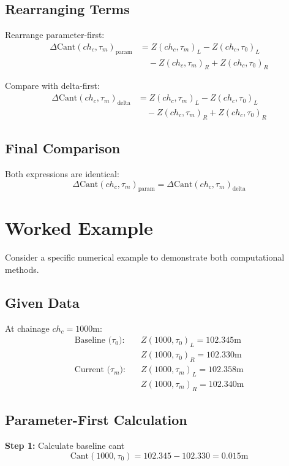 \documentclass{article}
\begin{document}
\subsection{Rearranging Terms}
Rearrange parameter-first:
\begin{align}
\Delta\text{Cant}(ch_c, \tau_m)_{\text{param}} &= Z(ch_c, \tau_m)_L - Z(ch_c, \tau_0)_L \nonumber \\
&\quad - Z(ch_c, \tau_m)_R + Z(ch_c, \tau_0)_R
\end{align}

Compare with delta-first:
\begin{align}
\Delta\text{Cant}(ch_c, \tau_m)_{\text{delta}} &= Z(ch_c, \tau_m)_L - Z(ch_c, \tau_0)_L \nonumber \\
&\quad - Z(ch_c, \tau_m)_R + Z(ch_c, \tau_0)_R
\end{align}

\subsection{Final Comparison}
Both expressions are identical:
\begin{equation}
\Delta\text{Cant}(ch_c, \tau_m)_{\text{param}} = \Delta\text{Cant}(ch_c, \tau_m)_{\text{delta}}
\end{equation}

\section{Worked Example}
Consider a specific numerical example to demonstrate both computational methods.

\subsection{Given Data}
At chainage $ch_c = 1000$m:
\begin{align}
\text{Baseline (}\tau_0\text{):} \quad &Z(1000, \tau_0)_L = 102.345\text{m} \nonumber \\
&Z(1000, \tau_0)_R = 102.330\text{m} \\[0.5em]
\text{Current (}\tau_m\text{):} \quad &Z(1000, \tau_m)_L = 102.358\text{m} \nonumber \\
&Z(1000, \tau_m)_R = 102.340\text{m}
\end{align}

\subsection{Parameter-First Calculation}
\textbf{Step 1:} Calculate baseline cant
\begin{equation}
\text{Cant}(1000, \tau_0) = 102.345 - 102.330 = 0.015\text{m}
\end{equation}
\end{document}
